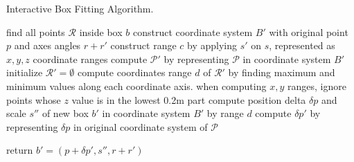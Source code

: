 \documentclass[letterpaper, 10 pt, conference]{ieeeconf}  %
\begin{document}
\begin{algorithm}
	\caption{Interactive Box Fitting Algorithm.}
	\label{alg:box-fitting}
	
	\SetAlgoLined
	\nl find all points $\mathcal{R}$ inside box $b$\;
	\nl construct coordinate system $B'$ with original point $p$ and axes angles $r+r'$\;
	\nl construct range $c$ by applying $s'$ on $s$, represented as $x,y,z$ coordinate ranges\;
	\nl compute $\mathcal{P'}$ by representing $\mathcal{P}$ in coordinate system $B'$\;
	\nl initialize $\mathcal{R'} = \emptyset$\;
	\nl compute coordinates range $d$ of $\mathcal{R'}$ by finding maximum and minimum values along each coordinate axis. when computing $x,y$ ranges, ignore points whose $z$ value is in the lowest 0.2m part\;
	\nl compute position delta $\delta p$ and scale $s''$ of new box $b'$ in coordinate system $B'$ by range $d$\;
	\nl compute $\delta p'$ by representing $\delta p$ in original coordinate system of $\mathcal{P}$
	
	\nl return $b' = (p+\delta p', s'', r+r')$\;
	
\end{algorithm}
\end{document}
